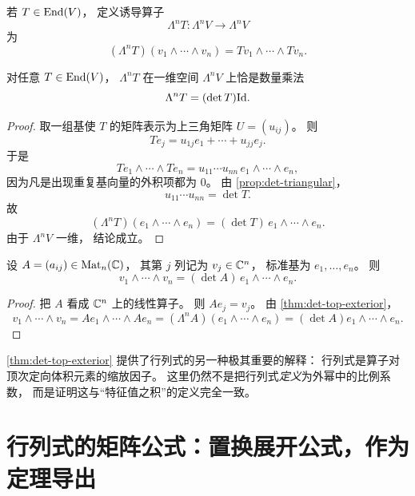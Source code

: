 \begin{definition} 若 \(T\in \mathrm{End}(V)\)， 定义诱导算子 \[ \Lambda^n T:\Lambda^n V\to \Lambda^n V \] 为 \[ (\Lambda^n T)(v_1\wedge\cdots\wedge v_n) = Tv_1\wedge\cdots\wedge Tv_n. \] \end{definition}




\begin{theorem}\label{thm:det-top-exterior} 对任意 \(T\in \mathrm{End}(V)\)， \(\Lambda^n T\) 在一维空间 \(\Lambda^n V\) 上恰是数量乘法 \[ \Lambda^n T=(\det T)\mathrm{Id}. \] \end{theorem}




\begin{proof} 取一组基使 \(T\) 的矩阵表示为上三角矩阵 \(U=(u_{ij})\)。 则 \[ Te_j=u_{1j}e_1+\cdots+u_{jj}e_j. \] 于是 \[ Te_1\wedge\cdots\wedge Te_n = u_{11}\cdots u_{nn}\,e_1\wedge\cdots\wedge e_n, \] 因为凡是出现重复基向量的外积项都为 \(0\)。 由 \cref{prop:det-triangular}， \[ u_{11}\cdots u_{nn}=\det T. \] 故 \[ (\Lambda^n T)(e_1\wedge\cdots\wedge e_n) = (\det T)\,e_1\wedge\cdots\wedge e_n. \] 由于 \(\Lambda^n V\) 一维， 结论成立。 \end{proof}




\begin{corollary}\label{cor:wedge-columns} 设 \(A=(a_{ij})\in \mathrm{Mat}_n(\mathbb{C})\)， 其第 \(j\) 列记为 \(v_j\in \mathbb{C}^n\)， 标准基为 \(e_1,\dots,e_n\)。 则 \[ v_1\wedge\cdots\wedge v_n = (\det A)\,e_1\wedge\cdots\wedge e_n. \] \end{corollary}




\begin{proof} 把 \(A\) 看成 \(\mathbb{C}^n\) 上的线性算子。 则 \(Ae_j=v_j\)。 由 \cref{thm:det-top-exterior}， \[ v_1\wedge\cdots\wedge v_n = Ae_1\wedge\cdots\wedge Ae_n = (\Lambda^n A)(e_1\wedge\cdots\wedge e_n) = (\det A)e_1\wedge\cdots\wedge e_n. \] \end{proof}




\begin{remark} \cref{thm:det-top-exterior} 提供了行列式的另一种极其重要的解释： 行列式是算子对顶次定向体积元素的缩放因子。 这里仍然不是把行列式\emph{定义}为外幂中的比例系数， 而是证明这与“特征值之积”的定义完全一致。 \end{remark}




\section{行列式的矩阵公式：置换展开公式，作为定理导出}




